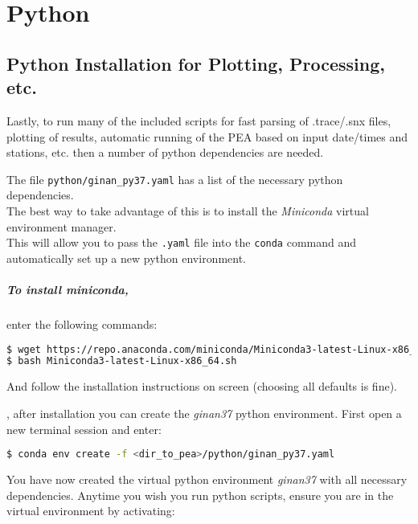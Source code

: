 
\chapter{Python}
\section{Python Installation for Plotting, Processing,
etc.}\label{python-installation-for-plotting-processing-etc.}

Lastly, to run many of the included scripts for fast parsing of
.trace/.snx files, plotting of results, automatic running of the PEA
based on input date/times and stations, etc. then a number of python
dependencies are needed.

The file \texttt{python/ginan\_py37.yaml} has a list of the necessary
python dependencies.\\
The best way to take advantage of this is to install the
\emph{\emph{Miniconda}} virtual environment manager.\\
This will allow you to pass the \texttt{.yaml} file into the
\texttt{conda} command and automatically set up a new python
environment.

\paragraph{To install miniconda,}enter the following commands:

\begin{lstlisting}[language=bash,caption=Installing conda]
$ wget https://repo.anaconda.com/miniconda/Miniconda3-latest-Linux-x86_64.sh
$ bash Miniconda3-latest-Linux-x86_64.sh
\end{lstlisting}

And follow the installation instructions on screen (choosing all
defaults is fine).

, after installation you can create the \emph{ginan37} python environment. First open a new terminal session and enter:

\begin{lstlisting}[language=bash,caption=Example showing how to create a conda environment]
$ conda env create -f <dir_to_pea>/python/ginan_py37.yaml
\end{lstlisting}

You have now created the virtual python environment \emph{ginan37}
with all necessary dependencies. Anytime you wish you run python
scripts, ensure you are in the virtual environment by activating:

